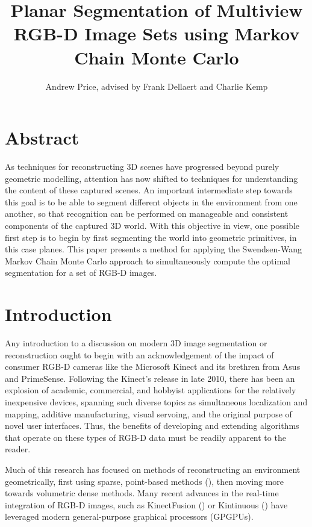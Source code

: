 \documentclass[10pt,letterpaper]{article}
\author{Andrew Price, advised by Frank Dellaert and Charlie Kemp}
\title{Planar Segmentation of Multiview RGB-D Image Sets using Markov Chain Monte Carlo }
\date{}
\begin{document}
\maketitle

\section{Abstract}
	As techniques for reconstructing 3D scenes have progressed beyond purely geometric modelling, attention has now shifted to techniques for understanding the content of these captured scenes. An important intermediate step towards this goal is to be able to segment different objects in the environment from one another, so that recognition can be performed on manageable and consistent components of the captured 3D world. With this objective in view, one possible first step is to begin by first segmenting the world into geometric primitives, in this case planes. This paper presents a method for applying the Swendsen-Wang Markov Chain Monte Carlo approach to simultaneously compute the optimal segmentation for a set of RGB-D images.
	
\section{Introduction}
	Any introduction to a discussion on modern 3D image segmentation or reconstruction ought to begin with an acknowledgement of the impact of consumer RGB-D cameras like the Microsoft Kinect and its brethren from Asus and PrimeSense. Following the Kinect's release in late 2010, there has been an explosion of academic, commercial, and hobbyist applications for the relatively inexpensive devices, spanning such diverse topics as simultaneous localization and mapping, additive manufacturing, visual servoing, and the original purpose of novel user interfaces. Thus, the benefits of developing and extending algorithms that operate on these types of RGB-D data must be readily apparent to the reader.
	
	Much of this research has focused on methods of reconstructing an environment geometrically, first using sparse, point-based methods (\cite{henry2010rgb}), then moving more towards volumetric dense methods. Many recent advances in the real-time integration of RGB-D images, such as KinectFusion (\cite{newcombe2011kinectfusion}) or Kintinuous (\cite{whelan2012kintinuous}) have leveraged modern general-purpose graphical processors (GPGPUs).
	
\end{document}
